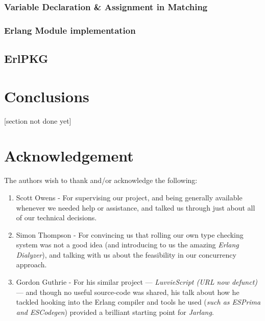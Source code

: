 \documentclass[twoside,12pt,titlepage,a4paper]{article}
\begin{document}
\subsubsection{Variable Declaration \& Assignment in Matching}
\subsubsection{Erlang Module implementation} \label{sssec:num1}
\subsection{ErlPKG}

\section{Conclusions}
\label{Conclusions}

[section not done yet]

\section{Acknowledgement}
The authors wish to thank and/or acknowledge the following:
\begin{enumerate}
\item Scott Owens - For supervising our project, and being generally available whenever we needed help or assistance, and talked us through just about all of our technical decisions.
\item Simon Thompson - For convincing us that rolling our own type checking system was not a good idea (and introducing to us the amazing \textit{Erlang Dialyzer}), and talking with us about the feasibility in our concurrency approach.
\item Gordon Guthrie - For his similar project --- \textit{LuvvieScript (URL now defunct)} --- and though no useful source-code was shared, his talk about how he tackled hooking into the Erlang compiler and tools he used (\textit{such as ESPrima and ESCodegen}) provided a brilliant starting point for \textit{Jarlang}.
\end{enumerate}
\appendix
\end{document}

